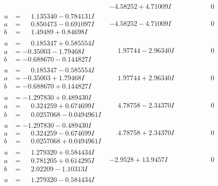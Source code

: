 \documentclass[1p]{elsarticle_modified}
\theoremstyle{definition}
\begin{document}
$$\begin{array}{c|c|c}
 & -4.58252 + 4.71009 I & \phantom{-0.000000 } 0 \\ \hline\begin{aligned}
u &= \phantom{-}1.135340 - 0.784131 I \\
a &= \phantom{-}0.850473 - 0.691097 I \\
b &= \phantom{-}1.49489 + 0.84698 I\end{aligned}
 & -4.58252 - 4.71009 I & \phantom{-0.000000 } 0 \\ \hline\begin{aligned}
u &= \phantom{-}0.185347 + 0.585554 I \\
a &= -0.35003 - 1.79468 I \\
b &= -0.688670 - 0.144827 I\end{aligned}
 & \phantom{-}1.97744 - 2.96340 I & \phantom{-0.000000 } 0 \\ \hline\begin{aligned}
u &= \phantom{-}0.185347 - 0.585554 I \\
a &= -0.35003 + 1.79468 I \\
b &= -0.688670 + 0.144827 I\end{aligned}
 & \phantom{-}1.97744 + 2.96340 I & \phantom{-0.000000 } 0 \\ \hline\begin{aligned}
u &= -1.297830 + 0.489430 I \\
a &= \phantom{-}0.324259 + 0.674699 I \\
b &= \phantom{-}0.0257068 - 0.0494961 I\end{aligned}
 & \phantom{-}4.78758 - 2.34370 I & \phantom{-0.000000 } 0 \\ \hline\begin{aligned}
u &= -1.297830 - 0.489430 I \\
a &= \phantom{-}0.324259 - 0.674699 I \\
b &= \phantom{-}0.0257068 + 0.0494961 I\end{aligned}
 & \phantom{-}4.78758 + 2.34370 I & \phantom{-0.000000 } 0 \\ \hline\begin{aligned}
u &= \phantom{-}1.279320 + 0.584434 I \\
a &= \phantom{-}0.781205 + 0.614295 I \\
b &= \phantom{-}2.02209 - 1.10313 I\end{aligned}
 & -2.9528 + 13.9457 I & \phantom{-0.000000 } 0 \\ \hline\begin{aligned}
u &= \phantom{-}1.279320 - 0.584434 I \\

\end{aligned}
\end{array}$$
\end{document}

